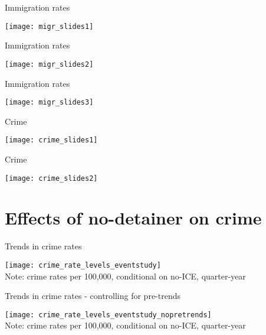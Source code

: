 \documentclass[xcolor=pdftex,dvipsnames,table]{beamer}
\begin{document}
\begin{frame}{Immigration rates}
\begin{center}
\texttt{[image: migr\_slides1]}
\end{center}
\end{frame}

\begin{frame}{Immigration rates}
\begin{center}
\texttt{[image: migr\_slides2]}
\end{center}
\end{frame}

\begin{frame}{Immigration rates}
\begin{center}
\texttt{[image: migr\_slides3]}
\end{center}
\end{frame}

\begin{frame}{Crime}
\begin{center}
\texttt{[image: crime\_slides1]}
\end{center}
\end{frame}

\begin{frame}{Crime}
\begin{center}
\texttt{[image: crime\_slides2]}
\end{center}
\end{frame}

\section{Effects of no-detainer on crime}
\begin{frame}{Trends in crime rates}
\begin{center}
\texttt{[image: crime\_rate\_levels\_eventstudy]}\\
\footnotesize{Note: crime rates per 100,000, conditional on no-ICE, quarter-year}
\end{center}
\end{frame}

\begin{frame}{Trends in crime rates - controlling for pre-trends}
\begin{center}
\texttt{[image: crime\_rate\_levels\_eventstudy\_nopretrends]}\\
\footnotesize{Note: crime rates per 100,000, conditional on no-ICE, quarter-year}
\end{center}
\end{frame}
\end{document}
